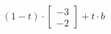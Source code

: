 \documentclass[preview]{standalone}
\begin{document}
\begin{align*}
(1- t ) \cdot \begin{bmatrix} -3 \\ -2 \end{bmatrix} + t \cdot b
\end{align*}
\end{document}
